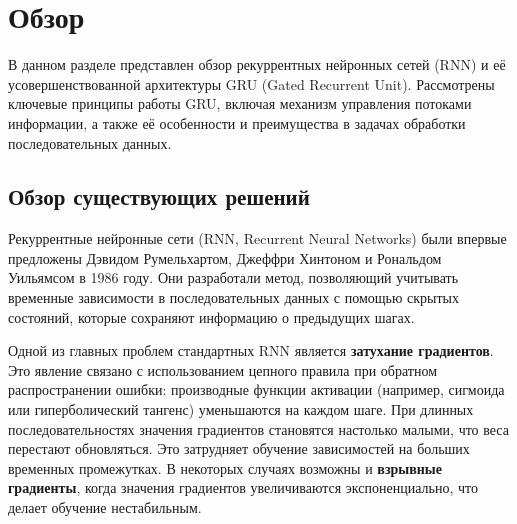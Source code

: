 
\section{Обзор}
\label{sec:relatedworks}
В данном разделе представлен обзор рекуррентных нейронных сетей (RNN) и её усовершенствованной архитектуры GRU (Gated Recurrent Unit). Рассмотрены ключевые принципы работы GRU, включая механизм управления потоками информации, а также её особенности и преимущества в задачах обработки последовательных данных.

\subsection{Обзор существующих решений}

Рекуррентные нейронные сети (RNN, Recurrent Neural Networks) были впервые предложены Дэвидом Румельхартом, Джеффри Хинтоном и Рональдом Уильямсом в 1986 году. Они разработали метод, позволяющий учитывать временные зависимости в последовательных данных с помощью скрытых состояний, которые сохраняют информацию о предыдущих шагах.

Одной из главных проблем стандартных RNN является \textbf{затухание градиентов}. Это явление связано с использованием цепного правила при обратном распространении ошибки: производные функции активации (например, сигмоида или гиперболический тангенс) уменьшаются на каждом шаге. При длинных последовательностях значения градиентов становятся настолько малыми, что веса перестают обновляться. Это затрудняет обучение зависимостей на больших временных промежутках. В некоторых случаях возможны и \textbf{взрывные градиенты}, когда значения градиентов увеличиваются экспоненциально, что делает обучение нестабильным.

